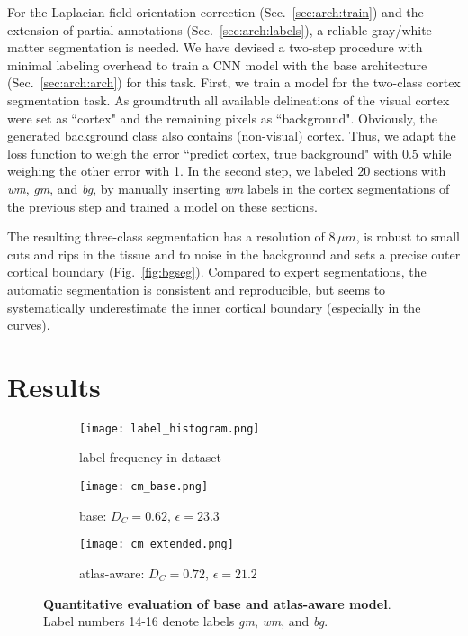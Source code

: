 \documentclass{article}
\begin{document}
For the Laplacian field orientation correction (Sec.~\ref{sec:arch:train}) and the extension of partial annotations (Sec.~\ref{sec:arch:labels}), a reliable gray/white matter segmentation is needed.
%
We have devised a two-step procedure with minimal labeling overhead to train a CNN model with the base architecture (Sec.~\ref{sec:arch:arch}) for this task.
First, we train a model for the two-class cortex segmentation task. 
As groundtruth all available delineations of the visual cortex were set as ``cortex" and the remaining pixels as ``background". 
Obviously, the generated background class also contains (non-visual) cortex. 
Thus, we adapt the loss function to weigh the error ``predict cortex, true background" with $0.5$ while weighing the other error with 1. 
In the second step, we labeled $20$ sections with \emph{wm}, \emph{gm}, and \emph{bg}, by manually inserting \emph{wm} labels in the cortex segmentations of the previous step and trained a model on these sections. %

The resulting three-class segmentation has a resolution of $8\,\mu m$, is robust to small cuts and rips in the tissue and to noise in the background and sets a precise outer cortical boundary (Fig.~\ref{fig:bgseg}). 
Compared to expert segmentations, the automatic segmentation is consistent and reproducible, but seems to systematically underestimate the inner cortical boundary (especially in the curves). 

\section{Results}
\label{sec:res}

\begin{figure}[tb]
	\centering
	\begin{subfigure}[t]{.28\columnwidth}
		\centering
		\texttt{[image: label\_histogram.png]}
		\caption{label frequency in dataset}
		\label{fig:hist}
	\end{subfigure}
	\begin{subfigure}[t]{.34\columnwidth}
		\centering
		\texttt{[image: cm\_base.png]}
		\caption{base: $D_C=0.62$, $\epsilon=23.3$}
		\label{}
	\end{subfigure}
	\begin{subfigure}[t]{.36\columnwidth}
		\centering
		\texttt{[image: cm\_extended.png]}
		\caption{atlas-aware: $D_C=0.72$, $\epsilon=21.2$}
		\label{}
	\end{subfigure}
	\caption{
		\textbf{Quantitative evaluation of base and atlas-aware model}. 
		Label numbers 14-16 denote labels \emph{gm}, \emph{wm}, and \emph{bg}.
		}
	\label{fig:cm}
\end{figure}
\end{document}

